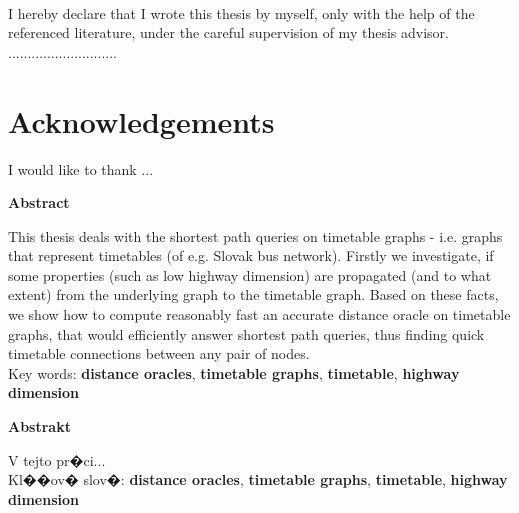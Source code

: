 \documentclass[a4paper]{article}
\renewenvironment{abstract}[1]
{
    \noindent
	\Large
	\begin{center}
		\textbf{#1}
	\end{center}
	
	\normalsize
	
	\addtolength{\leftskip}{1in}
	\addtolength{\rightskip}{1in}
	\setlength{\parindent}{0in}
}
{
}
\begin{document}
    \pagebreak

    {~}\vfill

    I hereby declare that I wrote this thesis by myself, only with the help of the referenced literature, under the careful supervision of my thesis advisor.
    \vskip 1cm
    \hfill ............................

    \pagebreak

    \section*{Acknowledgements}
    I would like to thank ...

    \pagebreak

    \begin{abstract}{Abstract}
        This thesis deals with the shortest path queries on timetable graphs - i.e. graphs that represent timetables (of e.g. Slovak bus network). Firstly we investigate, if some properties (such as low highway dimension) are propagated (and to what extent) from the underlying graph to the timetable graph. Based on these facts, we show how to compute reasonably fast an accurate distance oracle on timetable graphs, that would efficiently answer shortest path queries, thus finding quick timetable connections between any pair of nodes. \\

		Key words: \textbf{distance oracles}, \textbf{timetable graphs}, \textbf{timetable}, \textbf{highway dimension}
	\end{abstract}	

    \begin{abstract}{Abstrakt}
        V tejto pr�ci...\\

		Kl��ov� slov�: \textbf{distance oracles}, \textbf{timetable graphs}, \textbf{timetable}, \textbf{highway dimension}
	\end{abstract}	
	
\end{document}
